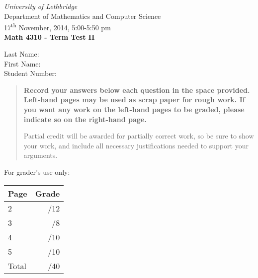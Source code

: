 \documentclass[12pt]{article}
\newcommand{\skipline}{\vspace{12pt}}
\begin{document}
\author{Instructor: Sean Fitzpatrick}
\thispagestyle{plain}
\begin{center}
\emph{University of Lethbridge}\\
Department of Mathematics and Computer Science\\
17\textsuperscript{th} November, 2014, 5:00-5:50 pm\\
{\bf Math 4310 - Term Test II}\\
\end{center}
\skipline \skipline \skipline \noindent \skipline
Last Name:\underline{\hspace{350pt}}\\
\skipline
First Name:\underline{\hspace{348pt}}\\
\skipline
Student Number:\underline{\hspace{322pt}}\\


\vspace{0.5in}


\begin{quote}
 {\bf Record your answers below each question in the space provided.    Left-hand pages may be used as scrap paper for rough work.  If you want any work on the left-hand pages to be graded, please indicate so on the right-hand page.
 
 \bigskip
 
Partial credit will be awarded for partially correct work, so be sure to show your work, and include all necessary justifications needed to support your arguments. 
}
\end{quote}


\vspace{0.5in}

For grader's use only:

\begin{table}[hbt]
\begin{center}
\begin{tabular}{|l|r|} \hline
Page&Grade\\
\hline \hline
\cline{1-2} 2 & \enspace\enspace\enspace\enspace\enspace\enspace/12\\
\cline{1-2} 3 & \enspace\enspace\enspace\enspace\enspace\enspace/8\\
\cline{1-2} 4 & \enspace\enspace\enspace\enspace\enspace\enspace/10\\
\cline{1-2} 5 & \enspace\enspace\enspace\enspace\enspace\enspace/10\\
\cline{1-2} Total & \enspace\enspace\enspace\enspace\enspace\enspace/40\\
\hline
\end{tabular}

\skipline

\skipline

\skipline


\end{center}
\end{table}
\newpage
\end{document}
